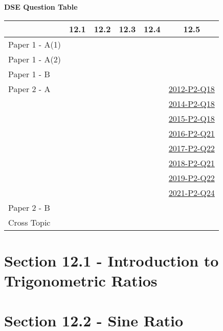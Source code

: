 \documentclass[12pt, a4paper]{article}
\begin{document}
\begin{absolutelynopagebreak}
\begin{center}
\textbf{DSE Question Table}
\end{center}
\begin{center}
\begin{tabular}{|l|c|c|c|c|c|}
\hline
        & 12.1 & 12.2 & 12.3 & 12.4 & 12.5 \\\hline
\hline
Paper 1 - A(1)&  &  &  &  &  \\
\hline
Paper 1 - A(2)&  &  &  &  &  \\
\hline
Paper 1 - B&  &  &  &  &  \\
\hline
\hline
Paper 2 - A&  &  &  &  & \hyperref[DSE2012-CoreP2-Q18]{2012-P2-Q18} \\
&  &  &  &  & \hyperref[DSE2014-CoreP2-Q18]{2014-P2-Q18} \\
&  &  &  &  & \hyperref[DSE2015-CoreP2-Q18]{2015-P2-Q18} \\
&  &  &  &  & \hyperref[DSE2016-CoreP2-Q21]{2016-P2-Q21} \\
&  &  &  &  & \hyperref[DSE2017-CoreP2-Q22]{2017-P2-Q22} \\
&  &  &  &  & \hyperref[DSE2018-CoreP2-Q21]{2018-P2-Q21} \\
&  &  &  &  & \hyperref[DSE2019-CoreP2-Q22]{2019-P2-Q22} \\
&  &  &  &  & \hyperref[DSE2021-CoreP2-Q24]{2021-P2-Q24} \\
\hline
Paper 2 - B&  &  &  &  &  \\
\hline
\hline
Cross Topic&  &  &  &  &  \\
\hline
\end{tabular}
\end{center}
\end{absolutelynopagebreak}




\section*{Section 12.1 - Introduction to Trigonometric Ratios}\label{section:2-12-1}





\section*{Section 12.2 - Sine Ratio}\label{section:2-12-2}
\end{document}
